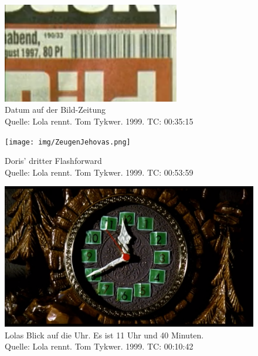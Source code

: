 \begin{appendix}
\begin{figure}[htbp]
	\centering
		\includegraphics[width=0.69\textwidth]{img/JackpotHerrlichkeit2.png}
	\caption[Datum auf der Bild-Zeitung]{Datum auf der Bild-Zeitung \\Quelle: Lola rennt. Tom Tykwer. 1999. TC: 00:35:15}
	\label{fig:DorisZweiterFlashforward2}
\end{figure}

\begin{figure}[htbp]
	\centering
		\texttt{[image: img/ZeugenJehovas.png]}
	\caption[Doris' dritter Flashforward]{Doris' dritter Flashforward \\Quelle: Lola rennt. Tom Tykwer. 1999. TC: 00:53:59}
	\label{fig:DorisDritterFlashforward}
\end{figure}

\begin{figure}[htbp]
	\centering
		\includegraphics[width=1.00\textwidth]{img/11Uhr40.png}
	\caption[11:40 Uhr]{Lolas Blick auf die Uhr. Es ist 11 Uhr und 40 Minuten. \\Quelle: Lola rennt. Tom Tykwer. 1999. TC: 00:10:42}
	\label{fig:11Uhr40}
\end{figure}


\end{appendix}
